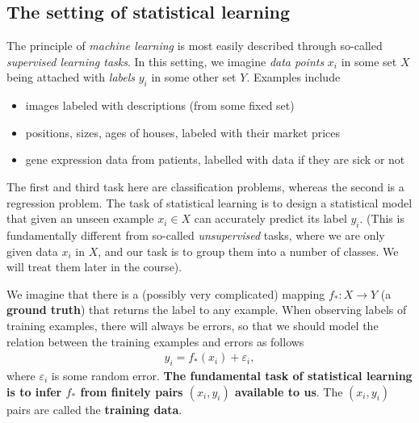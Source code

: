 \documentclass{article}
\begin{document}
\subsection{The setting of statistical learning}
The principle of \emph{machine learning} is most easily described through so-called \emph{supervised learning tasks}. In this setting, we imagine \emph{data points} $x_i$ in some set $X$
being attached with \emph{labels} $y_i$ in some other set $Y$. Examples include 
\begin{itemize}
    \item images labeled with descriptions (from some fixed set)
    \item positions, sizes, ages of houses, labeled with their market prices
    \item gene expression data from patients, labelled with data if they are sick or not 
\end{itemize}
The first and third task here are classification problems, whereas the second is a regression problem.
The task of statistical learning is to design a statistical model that given an unseen example $x_i \in X$ can accurately predict its label $y_i$. (This is fundamentally different from so-called \emph{unsupervised} tasks, where we are only given data $x_i$ in $X$, and our task is to group them into a number of classes. We will treat them later in the course).

We imagine that there is a (possibly very complicated)  mapping $f_*:X \to Y$ (a \textbf{ground truth}) that returns the label to any example. When observing labels of training examples, there will always be errors, so that we should model the relation between the training examples and errors as follows
\begin{align}
    y_i = f_*(x_i) + \varepsilon_i, \label{eq:model}
\end{align}
where $\varepsilon_i$ is some random error. \textbf{The fundamental task of statistical learning is to infer $f_*$ from finitely pairs $(x_i,y_i)$ available to us}. The $(x_i,y_i)$ pairs are called the \textbf{training data}.
\end{document}
